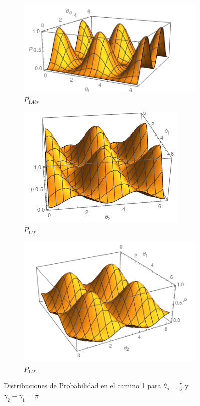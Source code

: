 \documentclass[11pt]{article}
\begin{document}
\begin{figure}[h!]
\centering
\begin{subfigure}[b]{0.45\linewidth}
\includegraphics[width=\linewidth]{P11abs.png}
\caption{$P_{1Abs}$}
\label{fig:BS1}
\end{subfigure}
\begin{subfigure}[b]{0.45\linewidth}
\includegraphics[width=\linewidth]{P11d1.png}
\caption{$P_{1D1}$}
\label{fig:westminster_aerea}
\end{subfigure}
\begin{subfigure}[b]{0.45\linewidth}
\includegraphics[width=\linewidth]{P11d2.png}
\caption{$P_{1D1}$}
\label{fig:BS1}
\end{subfigure}
\caption{Distribuciones de Probabilidad en el camino 1 para $\theta_{o}=\frac{\pi}{3}$ y $\gamma_{2}-\gamma_{1}=\pi$}
\label{fig:westminster}
\end{figure} 
\end{document}
